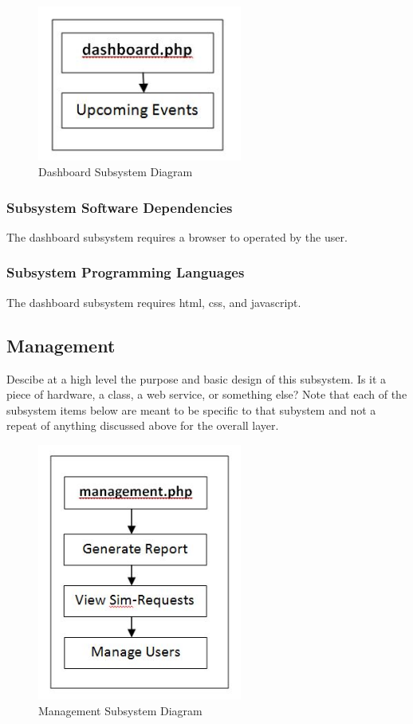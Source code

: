 \begin{figure}[h!]
	\centering
 	\includegraphics[width=0.60\textwidth]{images/dashboard}
 \caption{Dashboard Subsystem Diagram}
\end{figure}


\subsubsection{Subsystem Software Dependencies}
The dashboard subsystem requires a browser to operated by the user.

\subsubsection{Subsystem Programming Languages}
The dashboard subsystem requires html, css, and javascript.


\subsection{Management}
Descibe at a high level the purpose and basic design of this subsystem. Is it a piece of hardware, a class, a web service, or something else? Note that each of the subsystem items below are meant to be specific to that subystem and not a repeat of anything discussed above for the overall layer.

\begin{figure}[h!]
	\centering
 	\includegraphics[width=0.60\textwidth]{images/management}
 \caption{Management Subsystem Diagram}
\end{figure}


